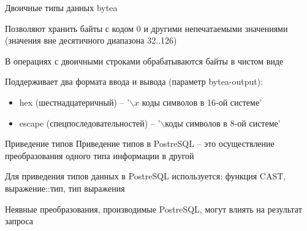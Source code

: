 \documentclass[12pt]{article}
\begin{document}
\begin{defin}{Двоичные типы данных}
    bytea

    Позволяют хранить байты с кодом 0 и другими непечатаемыми значениями (значения вне десятичного диапазона 32..126)

    В операциях с двоичными строками обрабатываются байты в чистом виде 

    Поддерживает два формата ввода и вывода (параметр bytea-output):

    \begin{itemize}
        \item hex (шестнадцатеричный) -- '$\backslash x$ коды символов в 16-ой системе'
        \item escape (спецпоследовательностей) -- '$\backslash$коды символов в 8-ой системе'
    \end{itemize}
\end{defin}

\begin{nota}{Приведение типов}
    Приведение типов в PostreSQL -- это осуществление преобразования одного типа информации в другой

    Для приведения типов данных в PostreSQL используется: функция CAST, выражение::тип, тип выражения 

    Неявные преобразования, производимые PostreSQL, могут влиять на результат запроса
\end{nota}
\end{document}
